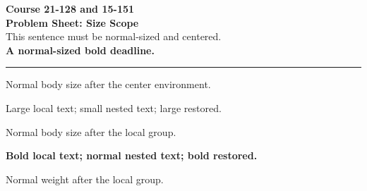 \documentclass[11pt]{article}
\begin{document}
\pagestyle{empty}
\begin{center}
{\Large\bfseries Course 21-128 and 15-151}\\[3pt]
{\LARGE\bfseries Problem Sheet: Size Scope}\\[7pt]
This sentence must be normal-sized and centered.\\[2pt]
\textbf{A normal-sized bold deadline.}
\end{center}
\hrule
\vspace{0.6em}
Normal body size after the center environment.

{\Large Large local text; {\small small nested text;} large restored.}

Normal body size after the local group.

{\bfseries Bold local text; {\normalfont normal nested text;} bold restored.}

Normal weight after the local group.
\end{document}
